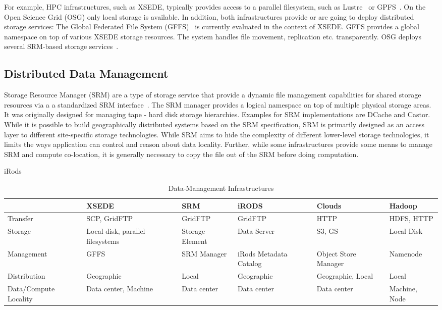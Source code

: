 \documentclass{sig-alternate}
\begin{document}
For example, HPC infrastructures, such as XSEDE, typically provides access to
a parallel filesystem, such as Lustre~\cite{lustre} or
GPFS~\cite{Schmuck:2002:GSF:1083323.1083349}. On the Open Science Grid (OSG)
only local storage is available. In addition, both infrastructures provide or
are going to deploy distributed storage services: The Global Federated File
System (GFFS)~\cite{gffs} is currently evaluated in the context of XSEDE. GFFS
provides a global namespace on top of various XSEDE storage resources. The
system handles file movement, replication etc. transparently. OSG deploys
several SRM-based storage services~\cite{srm-ogf}.


\subsection{Distributed Data Management}

Storage Resource Manager (SRM) are a type of storage service that provide a
dynamic file management capabilities for shared storage resources via a a
standardized SRM interface~\cite{srm-ogf}. The SRM manager provides a logical
namespace on top of multiple physical storage areas. It was originally
designed for managing tape - hard disk storage hierarchies. Examples for SRM
implementations are DCache and Castor. While it is possible to build
geographically distributed systems based on the SRM specification, SRM is
primarily designed as an access layer to different site-specific storage
technologies. While SRM aims to hide the complexity of different lower-level
storage technologies, it limits the ways application can control and reason
about data locality. Further, while some infrastructures provide some means to
manage SRM and compute co-location, it is generally necessary to copy the file
out of the SRM before doing computation.

iRods~\cite{Rajasekar:2010:IPI:1855046}




\begin{table*}[ht]
	\centering
\begin{tabular}{|p{2.5cm}|p{2.3cm}|p{2.3cm}|p{2.3cm}|p{2.3cm}|p{2.3cm}|}
		\hline
		&\textbf{XSEDE} &\textbf{SRM} &\textbf{iRODS} &\textbf{Clouds} &\textbf{Hadoop}\\
		\hline
		Transfer &SCP, GridFTP &GridFTP &GridFTP &HTTP &HDFS, HTTP\\
		\hline
		Storage &Local disk, parallel filesystems  &Storage Element &Data 
		Server &S3, GS &Local Disk\\
		\hline
		Management &GFFS &SRM Manager &iRods Metadata Catalog &Object Store 
		Manager    
		&Namenode\\
		\hline
		Distribution &Geographic &Local &Geographic
		&Geographic, Local &Local\\
		\hline
		Data/Compute Locality &Data center, Machine &Data center &Data center 
		&Data center &Machine, Node\\
		
		\hline
\end{tabular}
\caption{Data-Management Infrastructures}
\end{table*}
\end{document}
